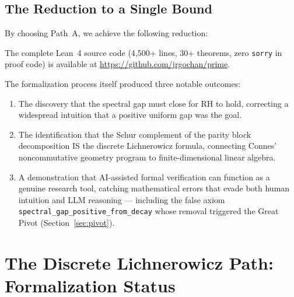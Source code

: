 \documentclass[11pt,a4paper]{article}
\theoremstyle{definition}
\theoremstyle{remark}
\newcommand{\lean}[1]{\texttt{#1}}
\begin{document}
\subsection{The Reduction to a Single Bound}

By choosing Path~A, we achieve the following reduction:

\begin{center}
\end{center}

\noindent The complete Lean~4 source code (4{,}500+ lines, 30+ theorems,
zero \texttt{sorry} in proof code) is available at
\url{https://github.com/jrgochan/prime}.

The formalization process itself produced three notable outcomes:
\begin{enumerate}
  \item The discovery that the spectral gap must close for RH to hold,
    correcting a widespread intuition that a positive uniform gap was the goal.

  \item The identification that the Schur complement of the parity block
    decomposition IS the discrete Lichnerowicz formula, connecting
    Connes' noncommutative geometry program to finite-dimensional linear algebra.

  \item A demonstration that AI-assisted formal verification can
    function as a genuine research tool, catching mathematical errors
    that evade both human intuition and LLM reasoning --- including the
    false axiom \lean{spectral\_gap\_positive\_from\_decay} whose
    removal triggered the Great Pivot (Section~\ref{sec:pivot}).
\end{enumerate}


\section{The Discrete Lichnerowicz Path: Formalization Status}\label{sec:future}
\end{document}
